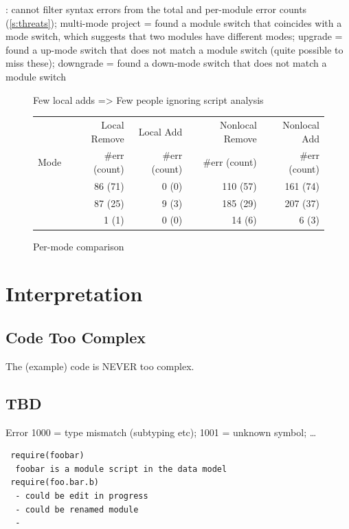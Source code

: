 \documentclass[
  acmsmall,
  review,
  anonymous,
]{acmart}
\begin{document}
:
cannot filter syntax errors from the total and per-module error counts (\cref{s:threats});
multi-mode project = found a module switch that coincides with a mode switch, which suggests that two modules have different modes;
upgrade = found a up-mode switch that does not match a module switch (quite possible to miss these);
downgrade = found a down-mode switch that does not match a module switch

\begin{figure}[t]

  {Few local adds => Few people ignoring script analysis}
  \smallskip

  \begin{tabular}{lrrrr}
    & Local Remove & Local Add & Nonlocal Remove & Nonlocal Add \\
    Mode
    & \#err (count)
    & \#err (count)
    & \#err (count)
    & \#err (count) \\\midrule
    \mnocheck{}   & 86 (71) & 0 (0) & 110 (57) & 161 (74) \\
    \mnonstrict{} & 87 (25) & 9 (3) & 185 (29) & 207 (37) \\
    \mstrict{}    &  1  (1) & 0 (0) &  14  (6) &   6  (3) \\
  \end{tabular}

  \caption{Per-mode comparison}
  \label{f:mode-errors}
\end{figure}

\section{Interpretation}

\subsection{Code Too Complex}

The (example) code is NEVER too complex.


\subsection{TBD}

Error 1000 = type mismatch (subtyping etc);
1001 = unknown symbol;
\ldots



\begin{verbatim}
 require(foobar)
  foobar is a module script in the data model
 require(foo.bar.b)
  - could be edit in progress
  - could be renamed module
  - 
\end{verbatim}
\end{document}
